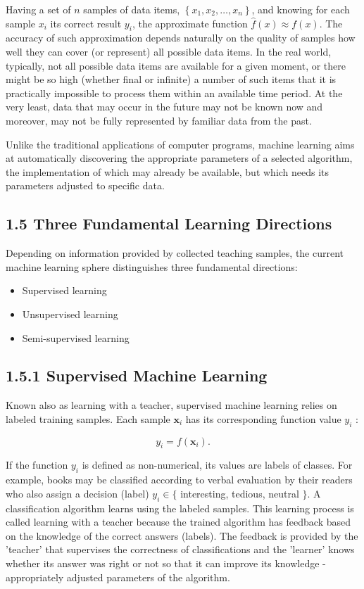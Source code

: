 \documentclass[10pt]{book}
\begin{document}
Having a set of $n$ samples of data items, $\left\{x_{1}, x_{2}, \ldots, x_{n}\right\}$, and knowing for each sample $x_{i}$ its correct result $y_{i}$, the approximate function $\hat{f}(x) \approx f(x)$. The accuracy of such approximation depends naturally on the quality of samples how well they can cover (or represent) all possible data items. In the real world, typically, not all possible data items are available for a given moment, or there\\
might be so high (whether final or infinite) a number of such items that it is practically impossible to process them within an available time period. At the very least, data that may occur in the future may not be known now and moreover, may not be fully represented by familiar data from the past.

Unlike the traditional applications of computer programs, machine learning aims at automatically discovering the appropriate parameters of a selected algorithm, the implementation of which may already be available, but which needs its parameters adjusted to specific data.

\subsection*{1.5 Three Fundamental Learning Directions}
Depending on information provided by collected teaching samples, the current machine learning sphere distinguishes three fundamental directions:

\begin{itemize}
  \item Supervised learning
  \item Unsupervised learning
  \item Semi-supervised learning
\end{itemize}

\subsection*{1.5.1 Supervised Machine Learning}
Known also as learning with a teacher, supervised machine learning relies on labeled training samples. Each sample $\mathbf{x}_{i}$ has its corresponding function value $y_{i}$ :

$$
y_{i}=f\left(\mathbf{x}_{i}\right) .
$$

If the function $y_{i}$ is defined as non-numerical, its values are labels of classes. For example, books may be classified according to verbal evaluation by their readers who also assign a decision (label) $y_{i} \in\{$ interesting, tedious, neutral $\}$. A classification algorithm learns using the labeled samples. This learning process is called learning with a teacher because the trained algorithm has feedback based on the knowledge of the correct answers (labels). The feedback is provided by the 'teacher' that supervises the correctness of classifications and the 'learner' knows whether its answer was right or not so that it can improve its knowledge - appropriately adjusted parameters of the algorithm.
\end{document}
